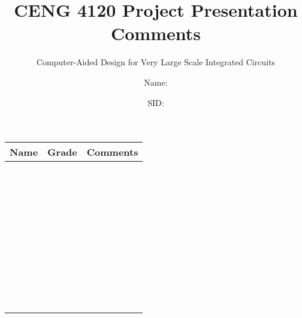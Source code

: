 \documentclass[acmlarge,screen=true,anonymous=false,11pt]{acmart}
\begin{document}
\title{CENG 4120 Project Presentation Comments}
\subtitle{Computer-Aided Design for Very Large Scale Integrated Circuits}
\author{Name: \qquad \qquad \qquad \qquad \qquad}
\author{SID: }

\maketitle

\begin{table}[H]
    \begin{tabular}{c|c|p{15cm}}
        \toprule
 Name	& Grade	& Comments\\\midrule
 	& 	& \\
 	& 	& \\
 	& 	& \\
 	& 	& \\
    & 	& \\
 	& 	& \\\midrule
 	& 	& \\
    & 	& \\
    & 	& \\
 	& 	& \\
 	& 	& \\
 	& 	& \\\midrule
 	& 	& \\
    & 	& \\
    & 	& \\
 	& 	& \\
 	& 	& \\
 	& 	& \\\midrule
 	& 	& \\
    & 	& \\
    & 	& \\
 	& 	& \\
 	& 	& \\
 	& 	& \\\midrule
 	& 	& \\
    & 	& \\
    & 	& \\
 	& 	& \\
 	& 	& \\
 	& 	& \\\midrule
 	& 	& \\
    & 	& \\
    & 	& \\
 	& 	& \\
 	& 	& \\
 	& 	& \\\midrule
 	& 	& \\
    & 	& \\
    & 	& \\
 	& 	& \\
 	& 	& \\
 	& 	& \\\bottomrule
    \end{tabular}
\end{table}
\end{document}
